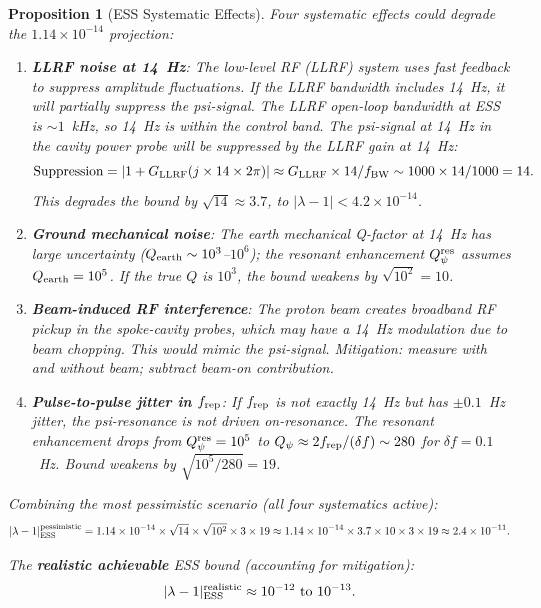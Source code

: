 \documentclass[11pt,twocolumn]{article}
\newcommand{\lam}{\lambda}
\newcommand{\ee}[1]{\times 10^{#1}}
\newtheorem{proposition}[theorem]{Proposition}
\begin{document}
\begin{proposition}[ESS Systematic Effects]
\label{prop:ess_systematics}
Four systematic effects could degrade the $1.14\ee{-14}$ projection:

\begin{enumerate}
\item \textbf{LLRF noise at 14~Hz}: The low-level RF (LLRF) system uses
  fast feedback to suppress amplitude fluctuations. If the LLRF bandwidth
  includes 14~Hz, it will partially suppress the psi-signal. The LLRF
  open-loop bandwidth at ESS is $\sim 1$~kHz, so 14~Hz is within the
  control band. The psi-signal at 14~Hz in the cavity power probe will
  be suppressed by the LLRF gain at 14~Hz:
  \begin{equation}
  \text{Suppression} = |1 + G_{\rm LLRF}(j\times14\times2\pi)|
  \approx G_{\rm LLRF}\times14/f_{\rm BW} \sim 1000\times14/1000 = 14.
  \label{eq:LLRF_suppression}
  \end{equation}
  This degrades the bound by $\sqrt{14} \approx 3.7$, to
  $|\lam-1| < 4.2\ee{-14}$.

\item \textbf{Ground mechanical noise}: The earth mechanical Q-factor
  at 14~Hz has large uncertainty ($Q_{\rm earth} \sim 10^3$--$10^6$);
  the resonant enhancement $Q_\psi^{\rm res}$ assumes $Q_{\rm earth} = 10^5$.
  If the true $Q$ is $10^3$, the bound weakens by $\sqrt{10^2} = 10$.

\item \textbf{Beam-induced RF interference}: The proton beam creates
  broadband RF pickup in the spoke-cavity probes, which may have a
  14~Hz modulation due to beam chopping. This would mimic the psi-signal.
  Mitigation: measure with and without beam; subtract beam-on contribution.

\item \textbf{Pulse-to-pulse jitter in $f_{\rm rep}$}: If $f_{\rm rep}$
  is not exactly 14~Hz but has $\pm 0.1$~Hz jitter, the psi-resonance is
  not driven on-resonance. The resonant enhancement drops from
  $Q_\psi^{\rm res} = 10^5$ to $Q_\psi \approx 2f_{\rm rep}/(\delta f)\sim 280$
  for $\delta f = 0.1$~Hz. Bound weakens by $\sqrt{10^5/280} = 19$.
\end{enumerate}

Combining the most pessimistic scenario (all four systematics active):
\begin{equation}
|\lam-1|_{\rm ESS}^{\rm pessimistic}
= 1.14\ee{-14}\times\sqrt{14}\times\sqrt{10^2}\times3\times19
\approx 1.14\ee{-14}\times3.7\times10\times3\times19
\approx 2.4\ee{-11}.
\label{eq:ess_pessimistic}
\end{equation}

The \textbf{realistic achievable} ESS bound (accounting for mitigation):
\begin{equation}
|\lam-1|_{\rm ESS}^{\rm realistic} \approx 10^{-12}~\text{to}~10^{-13}.
\label{eq:ess_realistic}
\end{equation}
\end{proposition}
\end{document}
